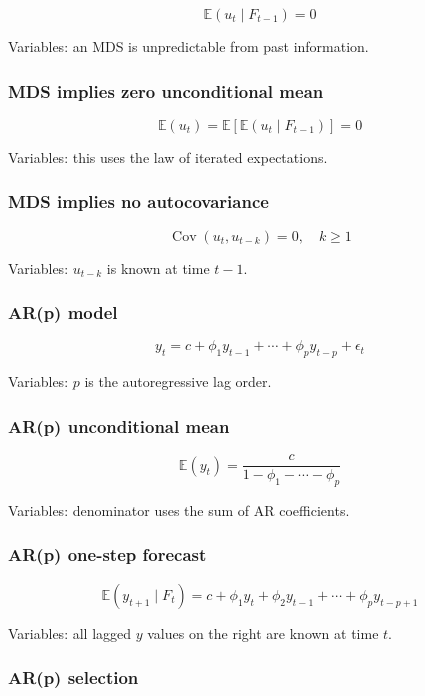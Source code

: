 \documentclass[
  8pt,
  twocolumn]{extarticle}
\begin{document}
\[
\mathbb E(u_t\mid F_{t-1})=0
\]

Variables: an MDS is unpredictable from past information.

\subsubsection{MDS implies zero unconditional
mean}\label{mds-implies-zero-unconditional-mean}

\[
\mathbb E(u_t)=\mathbb E[\mathbb E(u_t\mid F_{t-1})]=0
\]

Variables: this uses the law of iterated expectations.

\subsubsection{MDS implies no
autocovariance}\label{mds-implies-no-autocovariance}

\[
\operatorname{Cov}(u_t,u_{t-k})=0,\quad k\ge1
\]

Variables: \(u_{t-k}\) is known at time \(t-1\).

\subsubsection{AR(p) model}\label{arp-model}

\[
y_t=c+\phi_1y_{t-1}+\cdots+\phi_py_{t-p}+\epsilon_t
\]

Variables: \(p\) is the autoregressive lag order.

\subsubsection{AR(p) unconditional mean}\label{arp-unconditional-mean}

\[
\mathbb E(y_t)=\frac{c}{1-\phi_1-\cdots-\phi_p}
\]

Variables: denominator uses the sum of AR coefficients.

\subsubsection{AR(p) one-step forecast}\label{arp-one-step-forecast}

\[
\mathbb E(y_{t+1}\mid F_t)=c+\phi_1y_t+\phi_2y_{t-1}+\cdots+\phi_py_{t-p+1}
\]

Variables: all lagged \(y\) values on the right are known at time \(t\).

\subsubsection{AR(p) selection}\label{arp-selection}
\end{document}
